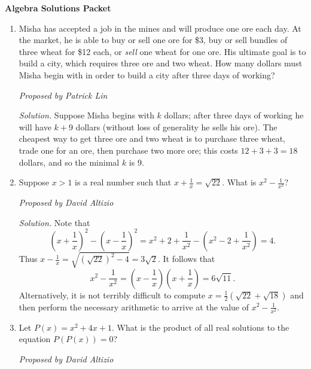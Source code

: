 \documentclass[10pt]{article}
\newcommand{\proposed}[1]
{
\vspace{5pt}
\noindent\textit{Proposed by #1}
}
\newcommand{\solution}
{
\vspace{5pt}
\noindent\textit{Solution.}\qquad
}
\begin{document}
\begin{center}
\huge\textbf{Algebra Solutions Packet}\normalsize

\vspace{3pt}
\end{center}

\begin{enumerate}

\item Misha has accepted a job in the mines and will produce one ore each day. At the market, he is able to buy or sell one ore for \$3, buy or sell bundles of three wheat for \$12 each, or \textit{sell} one wheat for one ore. His ultimate goal is to build a city, which requires three ore and two wheat. How many dollars must Misha begin with in order to build a city after three days of working?

\proposed{Patrick Lin}

\solution Suppose Misha begins with $k$ dollars; after three days of working he will have $k+9$ dollars (without loss of generality he sells his ore). The cheapest way to get three ore and two wheat is to purchase three wheat, trade one for an ore, then purchase two more ore; this costs $12 + 3 + 3 = 18$ dollars, and so the minimal $k$ is $\boxed{9}$.


\item Suppose $x>1$ is a real number such that $x+\tfrac 1x = \sqrt{22}$.  What is $x^2-\tfrac1{x^2}$?

\proposed{David Altizio}

\solution Note that \[\left(x + \frac1x\right)^2 - \left(x - \frac1x\right)^2 = x^2 + 2 + \frac{1}{x^2} - \left(x^2 - 2 + \frac1{x^2}\right) = 4.\] Thus $x - \tfrac1x = \sqrt{(\sqrt{22})^2 - 4} = 3\sqrt 2$.  It follows that \[x^2 - \frac{1}{x^2} = \left(x - \frac1x\right)\left(x + \frac 1x\right) = \boxed{6\sqrt{11}}.\] Alternatively, it is not terribly difficult to compute $x=\frac12(\sqrt{22}+\sqrt{18})$ and then perform the necessary arithmetic to arrive at the value of $x^2-\tfrac{1}{x^2}$.

\item Let $P(x)=x^2+4x+1$.  What is the product of all real solutions to the equation $P(P(x))=0$?

\proposed{David Altizio}


\end{enumerate}
\end{document}
